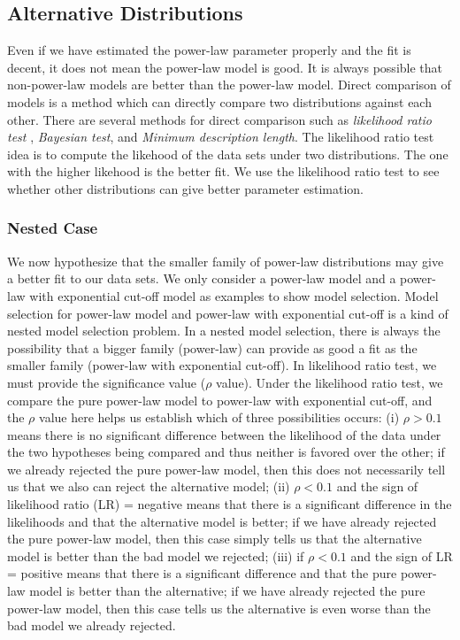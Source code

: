 \documentclass[paper]{ieice}
\begin{document}
\subsection{Alternative Distributions}
Even if we have estimated the power-law parameter properly and the fit is decent, it does not mean the power-law model is good.
It is always possible that non-power-law models are better than the power-law model.
Direct comparison of models is a method which can directly compare two distributions against each other.
There are several methods for direct comparison such as \textit{likelihood ratio test} \cite{vuong1989likelihood}, \textit{Bayesian test}, and \textit{Minimum description length}.
The likelihood ratio test idea is to compute the likehood of the data sets under two distributions. 
The one with the higher likehood is the better fit. 
We use the likelihood ratio test to see whether other distributions can give better parameter estimation.

\subsubsection{Nested Case}
We now hypothesize that the smaller family of power-law distributions may give a better fit to our data sets.
We only consider a power-law model and a power-law with exponential cut-off model as examples to show model selection.
Model selection for power-law model and power-law with exponential cut-off is a kind of nested model selection problem.
In a nested model selection,  there is always the possibility that a bigger family (power-law) can provide as good a fit as the smaller family (power-law with exponential cut-off).
In likelihood ratio test, we must provide the significance value ($\rho$ value).
Under the likelihood ratio test, we compare the pure power-law model to power-law with exponential cut-off, and the $\rho$ value here helps us establish which of three possibilities occurs: (i) $\rho > 0.1$ means there is no significant difference between the likelihood of the data under the two hypotheses being compared and thus neither is favored over the other; if we already rejected the pure power-law model, then this does not necessarily tell us that we also can reject the alternative model; (ii) $\rho  < 0.1$ and the sign of likelihood ratio (LR) = negative means that there is a significant difference in the likelihoods and that the alternative model is better; if we have already rejected the pure power-law model, then this case simply tells us that the alternative model is better than the bad model we rejected; (iii) if $\rho < 0.1$ and the sign of LR = positive means that there is a significant difference and that the pure power-law model is better than the alternative; if we have already rejected the pure power-law model, then this case tells us the alternative is even worse than the bad model we already rejected.
\end{document}
